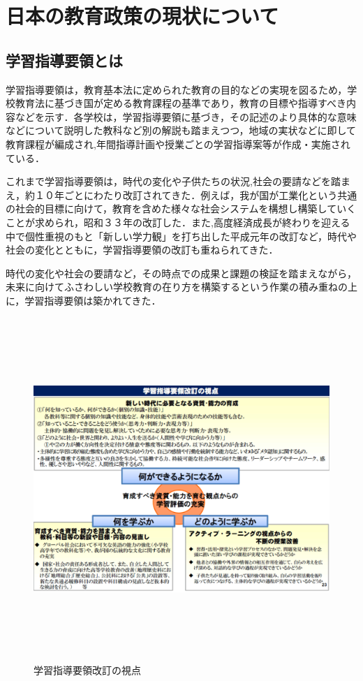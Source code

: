 \chapter{日本の教育政策の現状について}

\section{学習指導要領とは}

学習指導要領は，教育基本法に定められた教育の目的などの実現を図るため，学校教育法に基づき国が定める教育課程の基準であり，教育の目標や指導すべき内容などを示す\cite{学習指導要領}．各学校は，学習指導要領に基づき，その記述のより具体的な意味などについて説明した教科など別の解説も踏まえつつ，地域の実状などに即して教育課程が編成され,年間指導計画や授業ごとの学習指導案等が作成・実施されている．

これまで学習指導要領は，時代の変化や子供たちの状況,社会の要請などを踏まえ，約１０年ごとにわたり改訂されてきた．例えば，我が国が工業化という共通の社会的目標に向けて，教育を含めた様々な社会システムを構想し構築していくことが求められ，昭和３３年の改訂した．また,高度経済成長が終わりを迎える中で個性重視のもと「新しい学力観」を打ち出した平成元年の改訂など，時代や社会の変化とともに，学習指導要領の改訂も重ねられてきた．

時代の変化や社会の要請など，その時点での成果と課題の検証を踏まえながら，未来に向けてふさわしい学校教育の在り方を構築するという作業の積み重ねの上に，学習指導要領は築かれてきた．


\begin{figure}[hp]
\centering
\includegraphics[height=13cm,width=13cm]{gakusyuu.pdf}
\caption{学習指導要領改訂の視点}\label{サンプル図}
\end{figure}


